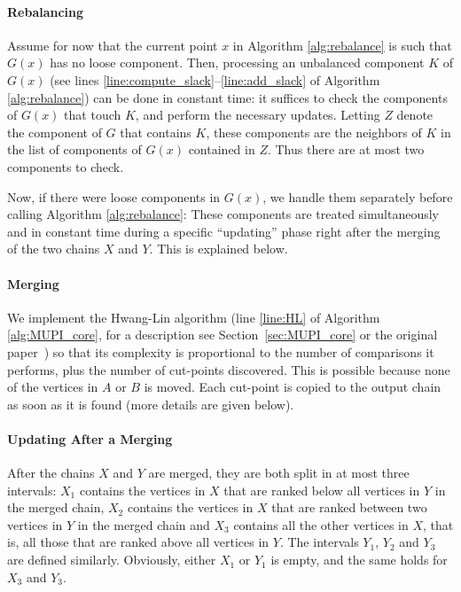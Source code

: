 \documentclass{article} \usepackage{fullpage}
\begin{document}
\paragraph*{Rebalancing} 

Assume for now that the current point $x$ in Algorithm \ref{alg:rebalance} is such that $G(x)$ has no loose component. Then, processing an unbalanced component $K$ of $G(x)$ (see lines \ref{line:compute_slack}--\ref{line:add_slack} of Algorithm \ref{alg:rebalance}) can be done in constant time: it suffices to check the components of $G(x)$ that touch $K$, and perform the necessary updates. Letting $Z$ denote the component of $G$ that contains $K$, these components are the neighbors of $K$ in the list of components of $G(x)$ contained in $Z$. Thus there are at most two components to check. 

Now, if there were loose components in $G(x)$, we handle them separately
before calling Algorithm \ref{alg:rebalance}: These components are treated
simultaneously and in constant time during a specific ``updating'' phase right after the merging of the two chains $X$ and $Y$. This is explained below.

\paragraph*{Merging}

We implement the Hwang-Lin algorithm (line \ref{line:HL} of Algorithm \ref{alg:MUPI_core}, for a description see Section~\ref{sec:MUPI_core} or the original paper~\cite{HL72}) so that its complexity is proportional to the number of comparisons it performs, plus the number of cut-points discovered. This is possible because none of the vertices in $A$ or $B$ is moved. Each cut-point is copied to the output chain as soon as it is found (more details are given below).

\paragraph*{Updating After a Merging}

After the chains $X$ and $Y$ are merged, they are both split in at most three intervals: $X_1$ contains the vertices in $X$ that are ranked below all vertices in $Y$ in the merged chain, $X_2$ contains the vertices in $X$ that are ranked between two vertices in $Y$ in the merged chain and $X_3$ contains all the other vertices in $X$, that is, all those that are ranked above all vertices in $Y$. The intervals $Y_1$, $Y_2$ and $Y_3$ are defined similarly. Obviously, either $X_1$ or $Y_1$ is empty, and the same holds for $X_3$ and $Y_3$.
\end{document}
